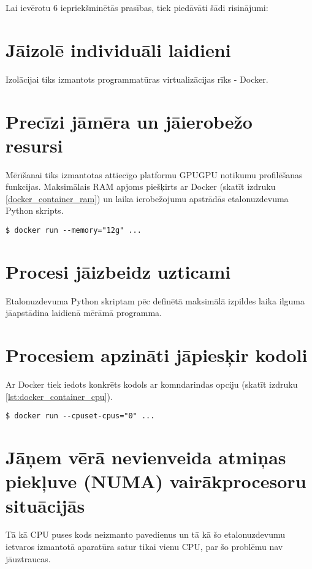 Lai ievērotu 6 iepriekšminētās prasības, tiek piedāvāti šādi risinājumi:

\section{Jāizolē individuāli laidieni}
Izolācijai tiks izmantots programmatūras virtualizācijas rīks - Docker.
\cite{docker-docs-engine}

\section{Precīzi jāmēra un jāierobežo resursi}
Mērīšanai tiks izmantotas attiecīgo platformu GPUGPU notikumu profilēšanas
funkcijas. Maksimālais RAM apjoms piešķirts ar Docker (skatīt izdruku
\ref{docker_container_ram}) un laika ierobežojumu apstrādās etalonuzdevuma
Python skripts.
\begin{lstlisting}[caption={Docker konteinera palaišana, piešķirot tam konkrēti
    12GiB RAM}, label=lst:docker_container_ram]
$ docker run --memory="12g" ...
\end{lstlisting}

\section{Procesi jāizbeidz uzticami}
Etalonuzdevuma Python skriptam pēc definētā maksimālā izpildes laika ilguma
jāapstādina laidienā mērāmā programma.

\section{Procesiem apzināti jāpiesķir kodoli}
Ar Docker tiek iedots konkrēts kodols ar komndarindas opciju (skatīt izdruku
\ref{lst:docker_container_cpu}).
\begin{lstlisting}[caption={Docker konteinera palaišana, piešķirot tam konkrēti
    pirmo CPU kodolu}, label=lst:docker_container_cpu]
$ docker run --cpuset-cpus="0" ...
\end{lstlisting}

\section{Jāņem vērā nevienveida atmiņas piekļuve (NUMA) vairākprocesoru situācijās}
Tā kā CPU puses kods neizmanto pavedienus un tā kā šo etalonuzdevumu ietvaros
izmantotā aparatūra satur tikai vienu CPU, par šo problēmu nav jāuztraucas.


